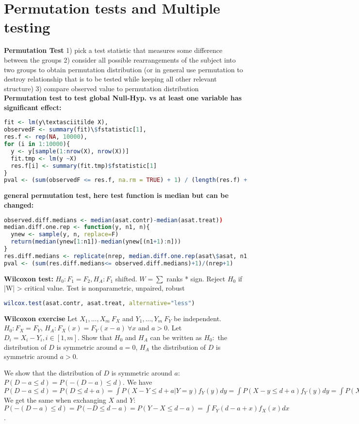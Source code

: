 \section{Permutation tests and Multiple testing}
\textbf{Permutation Test} 1) pick a test statistic that measures some difference between the groups 2) consider all possible rearrangements of the subject into two groups to obtain permutation distribution (or in general use permutation to destroy relationship that is to be tested while keeping all other relevant structure) 3) compare observed value to permutation distribution \\
\textbf{Permutation test to test global Null-Hyp. vs at least one variable has significant effect:}
\begin{lstlisting}[language=R]
fit <- lm(y\textasciitilde X),
observedF <- summary(fit)\$fstatistic[1],
res.f <- rep(NA, 10000),
for (i in 1:10000){
  y <- y[sample(1:nrow(X), nrow(X))]
  fit.tmp <- lm(y ~X)
  res.f[i] <- summary(fit.tmp)$fstatistic[1]
}
pval <- (sum(observedF <= res.f, na.rm = TRUE) + 1) / (length(res.f) + 1)\end{lstlisting}
\textbf{general permutation test, here test function is median but can be changed: }
\begin{lstlisting}[language=R]
observed.diff.medians <- median(asat.contr)-median(asat.treat))
median.diff.one.rep <- function(y, n1, n){
  ynew <- sample(y, n, replace=F)
  return(median(ynew[1:n1])-median(ynew[(n1+1):n]))
}
res.diff.medians <- replicate(nrep, median.diff.one.rep(asat\$asat, n1, n))
pval <- (sum(res.diff.medians<= observed.diff.medians)+1)/(nrep+1)
\end{lstlisting}
\textbf{Wilcoxon test: } $H_0: F_1 = F_2, H_A: F_1$ shifted. $W = \sum$ ranks * sign. Reject $H_0$ if |W| > critical value.
Test is nonparametric, unpaired, robust 
\begin{lstlisting}[language=R]
wilcox.test(asat.contr, asat.treat, alternative="less")
\end{lstlisting} 
\textbf{Wilcoxon exercise}
Let $X_1,...,X_m~F_X$ and $Y_1,...,Y_m~F_Y$ be independent. $H_0: F_X=F_Y$, $H_A: F_X(x) = F_Y(x-a) \  \forall x$ and $a>0$. Let $D_i = X_i - Y_i, i \in [1,m]$. Show that $H_0$ and $H_A$ can be written as $H_0: $ the distribution of $D$ is symmetric around $a=0$, $H_A$ the distribution of $D$ is symmetric around $a>0$.

We show that the distribution of $D$ is symmetric around $a$: $P(D-a \leq d) = P(-(D-a) \leq d)$. We have $P(D-a \leq d) = P(D \leq d + a) = \int P(X-Y \leq d+a |Y=y) f_Y(y) dy = \int P(X-y \leq d+a) f_Y(y) dy = \int P(X \leq d+a+y) f_Y(y) dy = \int F_X(d+a+y)f_Y(y)dy$ We get the same when exchanging $X$ and $Y$: $P(-(D-a)\leq d) = P(-D \leq d-a) = P(Y-X \leq d-a) = \int F_Y(d-a+x)f_X(x)dx$.

